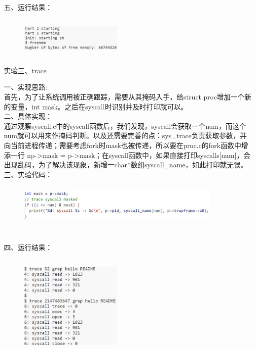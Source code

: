 \documentclass[12pt]{article}
\begin{document}
\noindent 五、运行结果：
\begin{figure}[htbp]
    \centering
    \includegraphics[width=5cm,height=2cm]{lab2-6.jpg}
\end{figure}
\newpage
\begin{Large}
    \noindent 实验三、trace\\
\end{Large}
\noindent 一、实现思路:\\
\hspace*{2em}首先，为了让系统调用被正确跟踪，需要从其掩码入手，给struct proc增加一个新的变量，int mask。之后在syscall时识别并及时打印就可以。\\
\noindent 二、具体实现：\\
\hspace*{2em}通过观察syscall.c中的syscall函数后，我们发现，syscall会获取一个num，而这个num就可以用来作掩码判断。以及还需要完善的点：sys\_trace负责获取参数，并向当前进程传递；需要考虑fork时mask也被传递，所以要在proc.c的fork函数中增添一行 np->mask = p->mask；在syscall函数中，如果直接打印syscalls[num]，会出现乱码，为了解决该现象，新增一char*数组syscall\_name，如此打印就无误。\\
\noindent 三、实验代码：
\begin{figure}[htbp]
    \centering
    \includegraphics[width=10cm,height=2cm]{lab2-7.jpg}
\end{figure}\\
\noindent 四、运行结果：
\begin{figure}[htbp]
    \centering
    \includegraphics[width=5cm,height=5cm]{lab2-8.jpg}
\end{figure}\\
\end{document}
